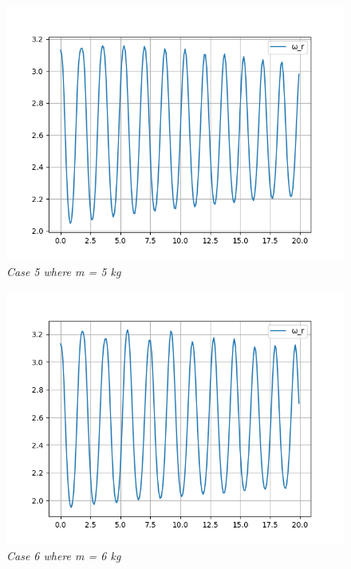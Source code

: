         \begin{figure}[H]
            \centering
            \includegraphics{Appendix/RExpPictures/F/fm5.png}
            \caption{\textit{Case 5 where m = 5 kg}}
            \label{}
        \end{figure}
            
        \begin{figure}[H]
            \centering
            \includegraphics{Appendix/RExpPictures/F/fm6.png}
            \caption{\textit{Case 6 where m = 6 kg}}
            \label{}
        \end{figure}
            
